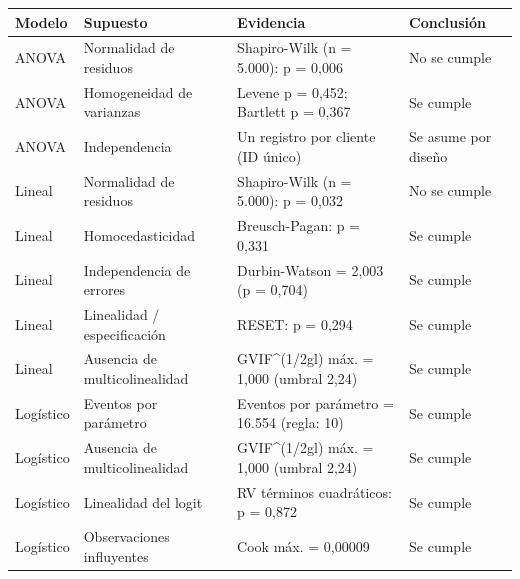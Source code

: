 \begin{tabular}{lp{3.4cm}p{5.3cm}l}
\toprule
Modelo & Supuesto & Evidencia & Conclusión \\
\midrule
ANOVA & Normalidad de residuos & Shapiro-Wilk (n = 5.000): p = 0,006 & No se cumple \\
ANOVA & Homogeneidad de varianzas & Levene p = 0,452; Bartlett p = 0,367 & Se cumple \\
ANOVA & Independencia & Un registro por cliente (ID único) & Se asume por diseño \\
Lineal & Normalidad de residuos & Shapiro-Wilk (n = 5.000): p = 0,032 & No se cumple \\
Lineal & Homocedasticidad & Breusch-Pagan: p = 0,331 & Se cumple \\
Lineal & Independencia de errores & Durbin-Watson = 2,003 (p = 0,704) & Se cumple \\
Lineal & Linealidad / especificación & RESET: p = 0,294 & Se cumple \\
Lineal & Ausencia de multicolinealidad & GVIF^(1/2gl) máx. = 1,000 (umbral 2,24) & Se cumple \\
Logístico & Eventos por parámetro & Eventos por parámetro = 16.554 (regla: 10) & Se cumple \\
Logístico & Ausencia de multicolinealidad & GVIF^(1/2gl) máx. = 1,000 (umbral 2,24) & Se cumple \\
Logístico & Linealidad del logit & RV términos cuadráticos: p = 0,872 & Se cumple \\
Logístico & Observaciones influyentes & Cook máx. = 0,00009 & Se cumple \\
\bottomrule
\end{tabular}
